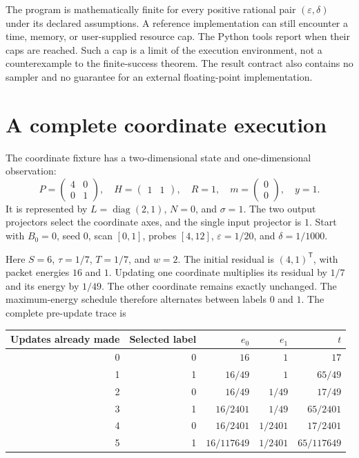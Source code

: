 The program is mathematically finite for every positive rational pair
$(\varepsilon,\delta)$ under its declared assumptions. A reference implementation
can still encounter a time, memory, or user-supplied resource cap. The Python tools
report  when their caps are reached. Such a cap is a limit of
the execution environment, not a counterexample to the finite-success theorem.
The result contract also contains no sampler and no guarantee for an external
floating-point implementation.

\section{A complete coordinate execution}
\label{sec:solver-coordinate}

The coordinate fixture has a two-dimensional state and one-dimensional
observation:
\[
 P=\begin{pmatrix}4&0\\0&1\end{pmatrix},\quad H=\begin{pmatrix}1&1\end{pmatrix},
 \quad R=1,\quad m=\begin{pmatrix}0\\0\end{pmatrix},\quad y=1.
\]
It is represented by $L=\operatorname{diag}(2,1)$, $N=0$, and $\sigma=1$.
The two output projectors select the coordinate axes, and the single input
projector is $1$. Start with $B_0=0$, seed $0$, scan $[0,1]$, probes $[4,12]$,
$\varepsilon=1/20$, and $\delta=1/1000$.

Here $S=6$, $\tau=1/7$, $T=1/7$, and $w=2$. The initial residual is $(4,1)^{\mathsf T}$,
with packet energies $16$ and $1$. Updating one coordinate multiplies its residual
by $1/7$ and its energy by $1/49$. The other coordinate remains exactly unchanged.
The maximum-energy schedule therefore alternates between labels $0$ and $1$.
The complete pre-update trace is
\begin{center}
\begin{tabular}{rrrrr}
\toprule
Updates already made & Selected label & $e_0$ & $e_1$ & $t$\\
\midrule
0 & 0 & $16$ & $1$ & $17$\\
1 & 1 & $16/49$ & $1$ & $65/49$\\
2 & 0 & $16/49$ & $1/49$ & $17/49$\\
3 & 1 & $16/2401$ & $1/49$ & $65/2401$\\
4 & 0 & $16/2401$ & $1/2401$ & $17/2401$\\
5 & 1 & $16/117649$ & $1/2401$ & $65/117649$\\
\bottomrule
\end{tabular}
\end{center}

